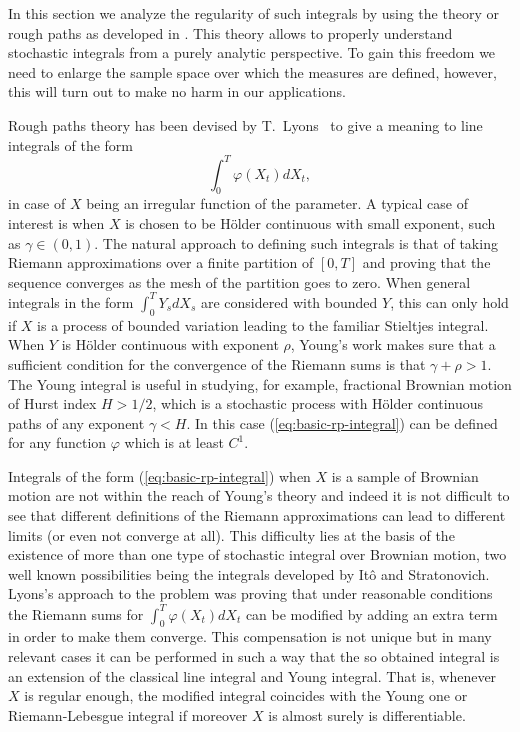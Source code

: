 \documentclass[a4paper,11pt]{article}
\begin{document}
In this section we analyze the regularity of such integrals by using
the theory or rough paths as developed in 
\cite{lyons-98,lyons-qian-02,MR2091358,feyel}. This theory allows to 
properly understand stochastic integrals from a purely analytic 
perspective. To gain this freedom we need to enlarge the sample space 
over which the measures are defined, however, this will turn out to 
make no harm in our applications.

Rough paths theory has been devised by T.~Lyons~\cite{lyons-98} to
give a meaning to line integrals of the form
\begin{equation}
  \label{eq:basic-rp-integral}
\int_0^T \varphi(X_t) dX_t,  
\end{equation}
in case of $X$ being an irregular function of the parameter. A typical
case of interest is when $X$ is chosen to be H\"older continuous with 
small exponent, such as $\gamma\in(0,1)$. 
The natural approach to defining such integrals is that of taking
Riemann approximations over a finite partition of $[0,T]$ and proving 
that the sequence converges as the mesh of the partition goes to zero. 
When general integrals in the form $\int_0^T Y_s dX_s$ are considered
with bounded $Y$, this can only hold if $X$ is a process of bounded 
variation leading to the familiar Stieltjes integral. When $Y$ is 
H\"older continuous with exponent $\rho$, Young's work \cite{young-36} 
makes sure that a sufficient condition for the convergence of the 
Riemann sums is that $\gamma+\rho > 1$. The Young integral is useful 
in studying, for example, fractional Brownian motion of Hurst index 
$H>1/2$, which is a stochastic process with H\"older continuous paths 
of any exponent $\gamma < H$. In this case (\ref{eq:basic-rp-integral}) 
can be defined for any function $\varphi$ which is at least $C^1$.

Integrals of the form (\ref{eq:basic-rp-integral}) when $X$ is a
sample of Brownian motion are not within the reach of Young's theory 
and indeed it is not difficult to see that different definitions of 
the Riemann approximations can lead to different limits (or even not 
converge at all). This difficulty lies at the basis of the existence 
of more than one type of stochastic integral over Brownian motion, 
two well known possibilities being the integrals developed by It\^o 
and Stratonovich. Lyons's approach to the problem was proving that 
under reasonable conditions the Riemann sums for $\int_0^T \varphi(X_t) 
dX_t$ can be modified by adding an extra term in order to make them
converge. This compensation is not unique but in many relevant cases 
it can be performed in such a way that the so obtained integral is an 
extension of the classical line integral and Young integral. That is,
whenever $X$ is regular enough, the modified integral coincides with 
the Young one or Riemann-Lebesgue integral if moreover $X$ is almost 
surely is differentiable.
\end{document}
